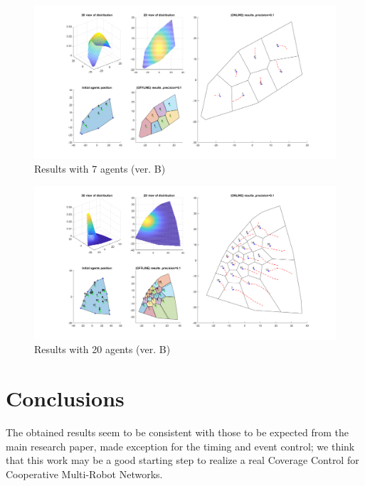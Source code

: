 \documentclass[a4paper,11pt,oneside]{book}
\begin{document}
	\begin{figure}	
		\centering	
		\includegraphics[scale=0.45,angle=90]{figs/convergenceResultsB.png}
		\caption{Results with 7 agents (ver. B)}\label{fig:convergenceResultsB.png}	
	\end{figure}
	
	\begin{figure}	
		\centering	
		\includegraphics[scale=0.45, angle=90]{figs/20convergenceResultsB.png}
		\caption{Results with 20 agents (ver. B)}\label{fig:20convergenceResultsB.png}	
	\end{figure}
	
	
	
	\chapter*{Conclusions} %
	The obtained results seem to be consistent with those to be expected from the main research paper, made exception for the timing and event control; we think that this work may be a good starting step to realize a real Coverage Control for Cooperative Multi-Robot Networks.\\\\
	
\end{document}
